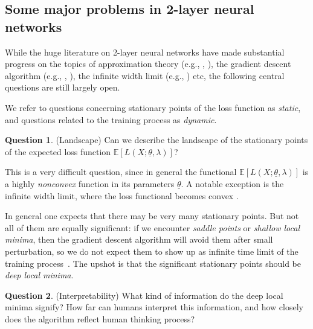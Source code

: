 \documentclass[a4paper]{article}
\theoremstyle{definition}
\newtheorem{Question}{Question}
\newcommand{\E}{\mathbb{E}}
\newcommand{\1}{\mathbbm{1}}
\begin{document}
	
	
	
	
	\subsection*{Some major problems in 2-layer neural networks}
	
	
	
	
	
	While the huge literature on 2-layer neural networks have made substantial progress on the topics of approximation theory (e.g., \cite{Cybenko, Barron}, \cite[Chapter 4]{Bach}), the gradient descent algorithm (e.g., \cite{BachChizat}, \cite[Chapter 5]{Bach}), the infinite width limit (e.g., \cite{RotskoffVandenEijnden, MeiMontanariNguyen}) etc, the following central questions are still largely open.
	
	
	
	
	
	We refer to questions concerning stationary points of the loss function as \emph{static}, and questions related to the training process as \emph{dynamic}. 
	
	
	
	\begin{Question}
		(Landscape)
		Can we describe the landscape of the stationary points of the expected loss function  $\E[ L(X; \underline{\theta}, \lambda)  ]$?
	\end{Question}
	
	
	
	This is a very difficult question, since in general the functional $\E[ L(X; \underline{\theta},\lambda)  ]$ is a highly \emph{nonconvex} function in its parameters $\underline{\theta}$. A notable exception is the infinite width limit, where the loss functional becomes convex \cite{BachChizat}.
	
	
	
	In general one expects that there may be very many stationary points. But not all of them are equally significant: if we encounter \emph{saddle points} or \emph{shallow local minima}, then the gradient descent algorithm will avoid them after small perturbation, so we do not expect them to show up as infinite time limit of the training process~\cite{Pemantle90}. The upshot is that the significant stationary points should be \emph{deep local minima}.
	
	
	
	
	
	\begin{Question}
		(Interpretability)  What kind of information do the deep local minima signify? How far can humans interpret this information, and how closely does the algorithm reflect human thinking process?
	\end{Question}
	
\end{document}
